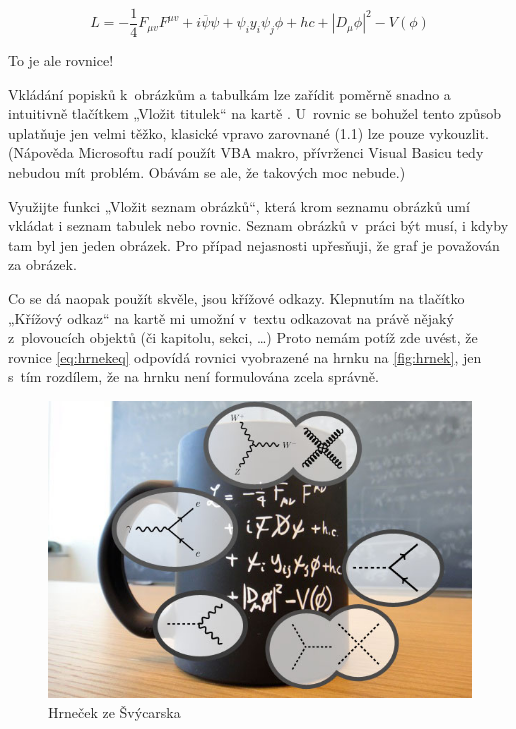 \documentclass{template/socthesis}
\begin{document}
\begin{listedequation}[h]
$$L = - \frac{1}{4}F_{{\mu}v}F^{{\mu}v} + i \overline{\psi} \psi + \psi_i y_i \psi_j \phi + hc + |D_\mu\phi|^2 - V(\phi)$$
\caption{To je ale rovnice!}
\label{eq:hrnekeq}
\end{listedequation}

Vkládání popisků k~obrázkům a tabulkám lze zařídit poměrně snadno a intuitivně tlačítkem „Vložit titulek“ na kartě .
U~rovnic se bohužel tento způsob uplatňuje jen velmi těžko, klasické vpravo zarovnané (1.1) lze pouze vykouzlit.
(Nápověda Microsoftu radí použít VBA makro, přívrženci Visual Basicu tedy nebudou mít problém.
Obávám se ale, že takových moc nebude.)

Využijte funkci „Vložit seznam obrázků“, která krom seznamu obrázků umí vkládat i seznam tabulek nebo rovnic.
Seznam obrázků v~práci být musí, i kdyby tam byl jen jeden obrázek.
Pro případ nejasnosti upřesňuji, že graf je považován za obrázek.

Co se dá naopak použít skvěle, jsou křížové odkazy.
Klepnutím na tlačítko „Křížový odkaz“ na kartě  mi umožní v~textu odkazovat na právě nějaký z~plovoucích objektů (či kapitolu, sekci, …) Proto nemám potíž zde uvést, že rovnice \autoref{eq:hrnekeq} odpovídá rovnici vyobrazené na hrnku na \autoref{fig:hrnek}, jen s~tím rozdílem, že na hrnku není formulována zcela správně.

\begin{figure}[h]
  	\centering
 	\includegraphics[width=\textwidth]{img/hrnek.jpg}
 	\caption{Hrneček ze Švýcarska}
 	\label{fig:hrnek}
\end{figure}
\end{document}
